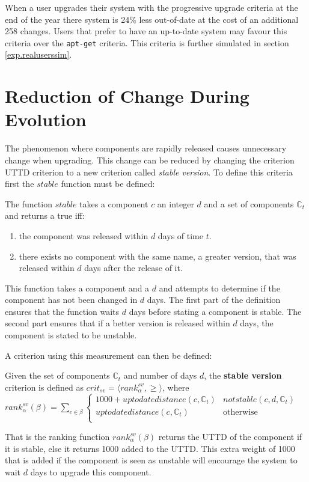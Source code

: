 When a user upgrades their system with the progressive upgrade criteria at the end of the year there system is 24\% less out-of-date at the cost of an additional 258 changes.
Users that prefer to have an up-to-date system may favour this criteria over the \texttt{apt-get} criteria. 
This criteria is further simulated in section \ref{exp.realuserssim}.

\section{Reduction of Change During Evolution}
\label{exp.stable}
The phenomenon where components are rapidly released causes unnecessary change when upgrading.
This change can be reduced by changing the criterion UTTD criterion to a new criterion called \textit{stable version}.
To define this criteria first the $stable$ function must be defined:
\begin{defs}
The function $stable$ takes a component $c$ an integer $d$ and a set of components $\mathbb{C}_t$ and returns a true iff:
\begin{enumerate}
  \item  the component was released within $d$ days of time $t$.
  \item there exists no component with the same name, a greater version, that was released within $d$ days after the release of it. 
\end{enumerate}
\end{defs}
This function takes a component and a $d$ and attempts to determine if the component has not been changed in $d$ days.
The first part of the definition ensures that the function waits $d$ days before stating a component is stable.
The second part ensures that if a better version is released within $d$ days, the component is stated to be unstable.

A criterion using this measurement can then be defined:
\begin{defs}
	Given the set of components $\mathbb{C}_t$ and number of days $d$, the \textbf{stable version} criterion is defined as $crit_{sv} = \langle rank^{sv}_{\alpha}, \geq \rangle$,
	where \\$rank^{sv}_{\alpha}(\beta) = \sum_{c \in \beta} \begin{cases} 1000 + uptodatedistance(c,\mathbb{C}_t)& not stable(c,d,\mathbb{C}_t) \\ uptodatedistance(c,\mathbb{C}_t) & \text{otherwise} \\  \end{cases}$
\end{defs}
That is the ranking function $rank^{sv}_{\alpha}(\beta)$ returns the UTTD of the component if it is stable,
else it returns 1000 added to the UTTD.
This extra weight of 1000 that is added if the component is seen as unstable will encourage the system to wait $d$ days to upgrade this component.


